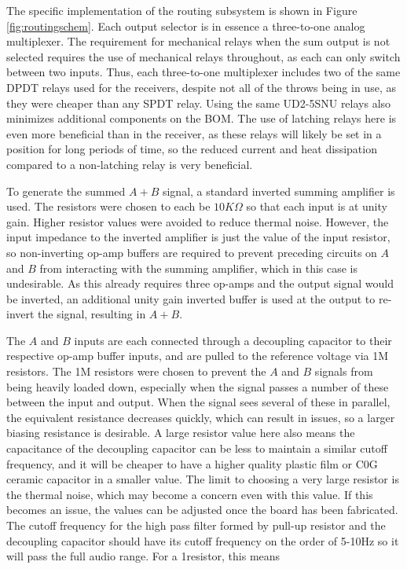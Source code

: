 	The specific implementation of the routing subsystem is shown in Figure \ref{fig:routingschem}.  Each output selector is in essence a three-to-one analog multiplexer.  The requirement for mechanical relays when the sum output is not selected requires the use of mechanical relays throughout, as each can only switch between two inputs.  Thus, each three-to-one multiplexer includes two of the same DPDT relays used for the receivers, despite not all of the throws being in use, as they were cheaper than any SPDT relay.  Using the same UD2-5SNU relays also minimizes additional components on the BOM.  The use of latching relays here is even more beneficial than in the receiver, as these relays will likely be set in a position for long periods of time, so the reduced current and heat dissipation compared to a non-latching relay is very beneficial.

	To generate the summed $A+B$ signal, a standard inverted summing amplifier is used.  The resistors were chosen to each be $10K\Omega$ so that each input is at unity gain.  Higher resistor values were avoided to reduce thermal noise.  However, the input impedance to the inverted amplifier is just the value of the input resistor, so non-inverting op-amp buffers are required to prevent preceding circuits on $A$ and $B$ from interacting with the summing amplifier, which in this case is undesirable.  As this already requires three op-amps and the output signal would be inverted, an additional unity gain inverted buffer is used at the output to re-invert the signal, resulting in $A+B$.

	The $A$ and $B$ inputs are each connected through a decoupling capacitor to their respective op-amp buffer inputs, and are pulled to the reference voltage via 1M resistors.  The 1M resistors were chosen to prevent the $A$ and $B$ signals from being heavily loaded down, especially when the signal passes a number of these between the input and output.  When the signal sees several of these in parallel, the equivalent resistance decreases quickly, which can result in issues, so a larger biasing resistance is desirable.  A large resistor value here also means the capacitance of the decoupling capacitor can be less to maintain a similar cutoff frequency, and it will be cheaper to have a higher quality plastic film or C0G ceramic capacitor in a smaller value.  The limit to choosing a very large resistor is the thermal noise, which may become a concern even with this value.  If this becomes an issue, the values can be adjusted once the board has been fabricated.  The cutoff frequency for the high pass filter formed by pull-up resistor and the decoupling capacitor should have its cutoff frequency on the order of 5-10Hz so it will pass the full audio range.  For a 1\Mohm resistor, this means

